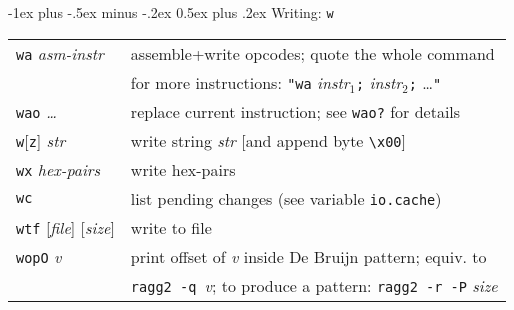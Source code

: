 \documentclass[a4paper,landscape]{article}
\makeatletter
\renewcommand{\section}{\@startsection{section}{1}{0mm}%
                                {-1ex plus -.5ex minus -.2ex}%
                                {0.5ex plus .2ex}%
                                {\normalfont\large\bfseries}}
\makeatother
\begin{document}
\begin{multicols*}{3}
\section{Writing: \texttt{w}}
\begin{tabular}{@{}ll@{}}
\texttt{wa} \textit{asm-instr} & assemble+write opcodes;
	quote the whole command \\ &  for more instructions:
\texttt{"wa} \textit{instr$_1$}\texttt{;} \textit{instr$_2$}\texttt{;} \ldots\texttt{"} \\
\texttt{wao} \textit{\ldots} & replace current instruction; see \texttt{wao?} for details \\
\texttt{w}[\texttt{z}] \textit{str} & write string \textit{str} [and append byte \texttt{\textbackslash x00}] \\
\texttt{wx} \textit{hex-pairs} & write hex-pairs \\
\texttt{wc} & list pending changes (see variable \texttt{io.cache}) \\
\texttt{wtf} [\textit{file}] [\textit{size}] & write to file \\
\texttt{wopO} \textit{v} & print offset of \textit{v} inside De Bruijn pattern; equiv. to\\
	& \texttt{ragg2 -q }\textit{v}; to produce a pattern: \texttt{ragg2 -r -P} \textit{size} \\
\end{tabular}


\end{multicols*}
\end{document}
